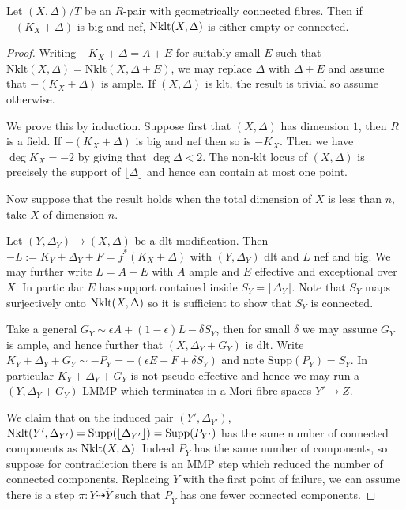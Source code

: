 \documentclass[a4paper,12pt]{book}
\newcommand{\D}{\Delta}
\newcommand{\nklt}{\textup{Nklt}}
\begin{document}
\begin{theorem}\label{WLC}
	Let $(X,\Delta)/T$ be an $R$-pair with geometrically connected fibres. Then if $-(K_{X}+\Delta)$ is big and nef, $\textup{Nklt}(X,\Delta)$ is either empty or connected.
\end{theorem}

\begin{proof}
	
	Writing $-K_{X}+\Delta=A+E$ for suitably small $E$ such that $\text{Nklt}(X,\Delta)=\text{Nklt}(X,\Delta+E)$, we may replace $\Delta$ with $\Delta+E$ and assume that $-(K_{X}+\Delta)$ is ample. If $(X,\Delta)$ is klt, the result is trivial so assume otherwise.
	
	We prove this by induction. Suppose first that $(X,\Delta)$ has dimension $1$, then $R$ is a field. If $-(K_{X}+\Delta)$ is big and nef then so is $-K_{X}$. Then we have $\deg K_{X} = -2$ by \cite[Corollary 2.8]{tanaka2018minimal} giving that $ \deg \Delta <2$. The non-klt locus of $(X,\Delta)$ is precisely the support of $\lfloor \D \rfloor$ and hence can contain at most one point.
	
	Now suppose that the result holds when the total dimension of $X$ is less than $n$, take $X$ of dimension $n$.
	
	Let $(Y,\D_{Y}) \to (X,\D)$ be a dlt modification. Then $-L:=K_{Y}+\D_{Y}+F=f^{*}(K_{X}+\D)$ with $(Y,\D_{Y})$ dlt and $L$ nef and big. We may further write $L=A+E$ with $A$ ample and $E$ effective and exceptional over $X$. In particular $E$ has support contained inside $S_{Y}=\lfloor \D_{Y} \rfloor$. Note that $S_{Y}$ maps surjectively onto $\nklt(X,\D)$ so it is sufficient to show that $S_{Y}$ is connected.
	
	Take a general $G_{Y} \sim \epsilon A +(1-\epsilon) L-\delta S_{Y}$, then for small $\delta$ we may assume $G_{Y}$ is ample, and hence further that $(X,\D_{Y}+G_{Y})$ is dlt. Write $K_{Y}+\D_{Y}+G_{Y}\sim - P_{Y}=-(\epsilon E + F + \delta S_{Y})$ and note $\text{Supp}(P_{Y})=S_{Y}$. In particular $K_{Y}+\D_{Y}+G_{Y}$ is not pseudo-effective and hence we may run a $(Y,\D_{Y}+G_{Y})$ LMMP which terminates in a Mori fibre spaces $Y' \to Z$. 
	
	We claim that on the induced pair $(Y',\D_{Y'})$, $\nklt(Y',\D_{Y'})=\text{Supp}(\lfloor \D_{Y'} \rfloor)=\text{Supp}(P_{Y'})$ has the same number of connected components as $\nklt(X,\Delta)$. Indeed $P_{Y}$ has the same number of components, so suppose for contradiction there is an MMP step which reduced the number of connected components. Replacing $Y$ with the first point of failure, we can assume there is a step $\pi: Y \dashrightarrow \hat{Y}$ such that $P_{\hat{Y}}$ has one fewer connected components. 
	

\end{proof}
\end{document}
